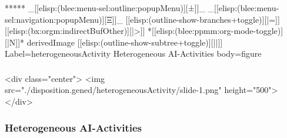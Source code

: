 \begin{whenOrg}
\begin{verblatex}
\begin{frame}[fragile,plain,label=homogeneousActivity]

\end{frame}
\end{verblatex}



\begin{whenOrg}
*****  _[[elisp:(blee:menu-sel:outline:popupMenu)][±]]_ _[[elisp:(blee:menu-sel:navigation:popupMenu)][Ξ]]_ [[elisp:(outline-show-branches+toggle)][|=]] [[elisp:(bx:orgm:indirectBufOther)][|>]] *[[elisp:(blee:ppmm:org-mode-toggle)][|N]]*  derivedImage [[elisp:(outline-show-subtree+toggle)][||]] Label=heterogeneousActivity Heterogeneous AI-Activities body=figure
\end{whenOrg}

\begin{htmlonly}

\begin{frame}[fragile,plain,label=heterogeneousActivity]
    \frametitle{}
    \framesubtitle{}
    \begin{rawhtml}
<div class="center">
<img src="./disposition.gened/heterogeneousActivity/slide-1.png" height="500">
</div>
    \end{rawhtml}
\end{frame}
\end{htmlonly}

\begin{verblatex}

\begin{frame}[fragile,plain,label=heterogeneousActivity]
    \frametitle{Heterogeneous AI-Activities}
    \framesubtitle{}


\end{frame}
\end{verblatex}
\end{whenOrg}
